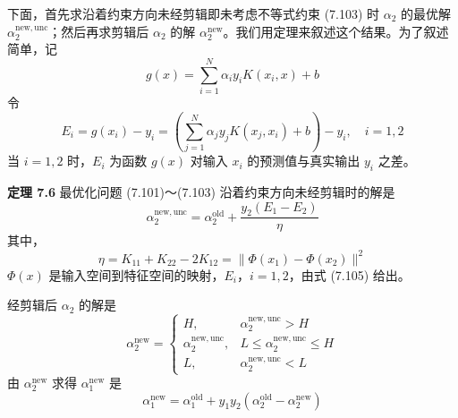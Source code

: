 \documentclass[UTF8,12pt,a4paper,fontset=fandol]{ctexart}
\begin{document}
下面，首先求沿着约束方向未经剪辑即未考虑不等式约束 (7.103) 时 $\alpha_2$ 的最优解 $\alpha_2^{\mathrm{new,unc}}$；然后再求剪辑后 $\alpha_2$ 的解 $\alpha_2^{\mathrm{new}}$。我们用定理来叙述这个结果。为了叙述简单，记
\begin{equation}
g(x)=\sum_{i=1}^N\alpha_i y_iK(x_i,x)+b
\tag{7.104}
\end{equation}
令
\begin{equation}
E_i=g(x_i)-y_i=\left(\sum_{j=1}^N\alpha_jy_jK(x_j,x_i)+b\right)-y_i,\quad i=1,2
\tag{7.105}
\end{equation}
当 $i=1,2$ 时，$E_i$ 为函数 $g(x)$ 对输入 $x_i$ 的预测值与真实输出 $y_i$ 之差。

\noindent\textbf{定理 7.6}\quad
最优化问题 (7.101)～(7.103) 沿着约束方向未经剪辑时的解是
\begin{equation}
\alpha_2^{\mathrm{new,unc}}=\alpha_2^{\mathrm{old}}+\frac{y_2(E_1-E_2)}{\eta}
\tag{7.106}
\end{equation}
其中，
\begin{equation}
\eta=K_{11}+K_{22}-2K_{12}=\|\Phi(x_1)-\Phi(x_2)\|^2
\tag{7.107}
\end{equation}
$\Phi(x)$ 是输入空间到特征空间的映射，$E_i$，$i=1,2$，由式 (7.105) 给出。

经剪辑后 $\alpha_2$ 的解是
\begin{equation}
\alpha_2^{\mathrm{new}}=
\begin{cases}
H,& \alpha_2^{\mathrm{new,unc}}>H\\
\alpha_2^{\mathrm{new,unc}},& L\leq\alpha_2^{\mathrm{new,unc}}\leq H\\
L,& \alpha_2^{\mathrm{new,unc}}<L
\end{cases}
\tag{7.108}
\end{equation}
由 $\alpha_2^{\mathrm{new}}$ 求得 $\alpha_1^{\mathrm{new}}$ 是
\begin{equation}
\alpha_1^{\mathrm{new}}=\alpha_1^{\mathrm{old}}+y_1y_2(\alpha_2^{\mathrm{old}}-\alpha_2^{\mathrm{new}})
\tag{7.109}
\end{equation}
\end{document}

